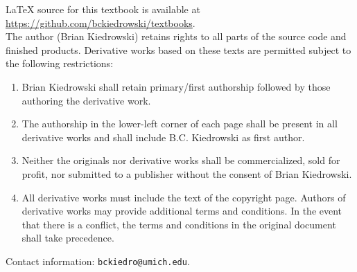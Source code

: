 \noindent LaTeX source for this textbook is available at \\ \url{https://github.com/bckiedrowski/textbooks}. \\

\noindent The author (Brian Kiedrowski) retains rights to all parts of the source code and finished products. Derivative works based on these texts are permitted subject to the following restrictions:
\begin{enumerate}
  \item Brian Kiedrowski shall retain primary/first authorship followed by those authoring the derivative work.
  \item The authorship in the lower-left corner of each page shall be present in all derivative works and shall include B.C. Kiedrowski as first author.
  \item Neither the originals nor derivative works shall be commercialized, sold for profit, nor submitted to a publisher without the consent of Brian Kiedrowski.
  \item All derivative works must include the text of the copyright page. Authors of derivative works may provide additional terms and conditions. In the event that there is a conflict, the terms and conditions in the original document shall take precedence.
\end{enumerate}

\noindent Contact information: \texttt{bckiedro@umich.edu}.
\normalsize
 
\newpage

%
%
%

